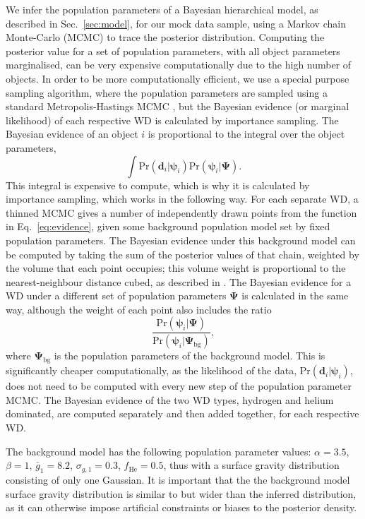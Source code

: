 \documentclass[fleqn,usenatbib]{mnras}
\newcommand{\popp}{\boldsymbol{\Psi}}
\newcommand{\objp}{\boldsymbol{\psi}}
\newcommand{\data}{\mathbf{d}}
\newcommand{\pr}{\text{Pr}}
\begin{document}
We infer the population parameters of a Bayesian hierarchical model, as described in Sec.~\ref{sec:model}, for our mock data sample, using a Markov chain Monte-Carlo (MCMC) to trace the posterior distribution. Computing the posterior value for a set of population parameters, with all object parameters marginalised, can be very expensive computationally due to the high number of objects. In order to be more computationally efficient, we use a special purpose sampling algorithm, where the population parameters are sampled using a standard Metropolis-Hastings MCMC \citep{BayesianDataAnalysis}, but the Bayesian evidence (or marginal likelihood) of each respective WD is calculated by importance sampling. The Bayesian evidence of an object $i$ is proportional to the integral over the object parameters,
\begin{equation}\label{eq:evidence}
	\int \pr(\data_i|\objp_i) \pr(\objp_i | \popp).
\end{equation}
This integral is expensive to compute, which is why it is calculated by importance sampling, which works in the following way. For each separate WD, a thinned MCMC gives a number of independently drawn points from the function in Eq.~\eqref{eq:evidence}, given some background population model set by fixed population parameters. The Bayesian evidence under this background model can be computed by taking the sum of the posterior values of that chain, weighted by the volume that each point occupies; this volume weight is proportional to the nearest-neighbour distance cubed, as described in \cite{2017arXiv170403472H}. The Bayesian evidence for a WD under a different set of population parameters $\popp$ is calculated in the same way, although the weight of each point also includes the ratio
\begin{equation}\label{eq:weight}
	\frac{\pr(\objp_i | \popp)}{\pr(\objp_i | \popp_\text{bg})},
\end{equation}
where $\popp_\text{bg}$ is the population parameters of the background model. This is significantly cheaper computationally, as the likelihood of the data, $\pr(\data_i|\objp_i)$, does not need to be computed with every new step of the population parameter MCMC. The Bayesian evidence of the two WD types, hydrogen and helium dominated, are computed separately and then added together, for each respective WD.

The background model has the following population parameter values: $\alpha = 3.5$, $\beta = 1$, $\bar{g}_1 = 8.2$, $\sigma_{g,1} = 0.3$, $f_\text{He} = 0.5$, thus with a surface gravity distribution consisting of only one Gaussian. It is important that the the background model surface gravity distribution is similar to but wider than the inferred distribution, as it can otherwise impose artificial constraints or biases to the posterior density.
\end{document}
